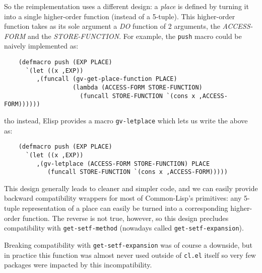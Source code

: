 \documentclass[format=acmsmall, review=false, screen=true]{acmart}
\newcommand \Elisp {Elisp}
\begin{document}
So the reimplementation uses a different design: a \emph{place} is defined
by turning it into a single higher-order function (instead of a 5-tuple).
This higher-order function takes as its sole argument a \textsl{DO} function
of 2 arguments, the \textsl{ACCESS-FORM} and the \textsl{STORE-FUNCTION}.
For example, the \texttt{push} macro could be naively implemented as:
\begin{verbatim}
    (defmacro push (EXP PLACE)
      `(let ((x ,EXP))
         ,(funcall (gv-get-place-function PLACE)
                   (lambda (ACCESS-FORM STORE-FUNCTION)
                     (funcall STORE-FUNCTION `(cons x ,ACCESS-FORM))))))
\end{verbatim}
tho instead, \Elisp{} provides a macro \texttt{gv-letplace} which lets us
write the above as:
\begin{verbatim}
    (defmacro push (EXP PLACE)
      `(let ((x ,EXP))
         ,(gv-letplace (ACCESS-FORM STORE-FUNCTION) PLACE
            (funcall STORE-FUNCTION `(cons x ,ACCESS-FORM)))))
\end{verbatim}
This design generally leads to cleaner and simpler code, and we can easily
provide backward compatibility wrappers for most of Common-Lisp's
primitives: any 5-tuple representation of a place can easily be turned into
a corresponding higher-order function.  The reverse is not true, however, so
this design precludes compatibility with \texttt{get-setf-method} (nowadays
called \texttt{get-setf-expansion}).

Breaking compatibility with \texttt{get-setf-expansion} was of course
a downside, but in practice this function was almost never used outside of
\texttt{cl.el} itself so very few packages were impacted by
this incompatibility.
\end{document}
